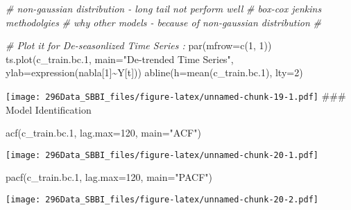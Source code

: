 \documentclass[
]{article}
\newenvironment{Shaded}{\begin{snugshade}}{\end{snugshade}}
\newcommand{\AttributeTok}[1]{\textcolor[rgb]{0.77,0.63,0.00}{#1}}
\newcommand{\CommentTok}[1]{\textcolor[rgb]{0.56,0.35,0.01}{\textit{#1}}}
\newcommand{\DecValTok}[1]{\textcolor[rgb]{0.00,0.00,0.81}{#1}}
\newcommand{\FloatTok}[1]{\textcolor[rgb]{0.00,0.00,0.81}{#1}}
\newcommand{\FunctionTok}[1]{\textcolor[rgb]{0.00,0.00,0.00}{#1}}
\newcommand{\NormalTok}[1]{#1}
\newcommand{\SpecialCharTok}[1]{\textcolor[rgb]{0.00,0.00,0.00}{#1}}
\newcommand{\StringTok}[1]{\textcolor[rgb]{0.31,0.60,0.02}{#1}}
\begin{document}
\begin{Shaded}
\begin{Highlighting}[]
\CommentTok{\# non{-}gaussian distribution {-} long tail not perform well}
\CommentTok{\# box{-}cox jenkins methodolgies }
\CommentTok{\# why other models {-} because of non{-}gaussian distribution}
\CommentTok{\# }
\end{Highlighting}
\end{Shaded}

\begin{Shaded}
\begin{Highlighting}[]
\CommentTok{\# Plot it for De{-}seasonlized Time Series :}
\FunctionTok{par}\NormalTok{(}\AttributeTok{mfrow=}\FunctionTok{c}\NormalTok{(}\DecValTok{1}\NormalTok{, }\DecValTok{1}\NormalTok{))}
\FunctionTok{ts.plot}\NormalTok{(c\_train.bc}\FloatTok{.1}\NormalTok{, }\AttributeTok{main=}\StringTok{"De{-}trended Time Series"}\NormalTok{,}
\AttributeTok{ylab=}\FunctionTok{expression}\NormalTok{(nabla[}\DecValTok{1}\NormalTok{]}\SpecialCharTok{\textasciitilde{}}\NormalTok{Y[t]))}
\FunctionTok{abline}\NormalTok{(}\AttributeTok{h=}\FunctionTok{mean}\NormalTok{(c\_train.bc}\FloatTok{.1}\NormalTok{), }\AttributeTok{lty=}\DecValTok{2}\NormalTok{)}
\end{Highlighting}
\end{Shaded}

\texttt{[image: 296Data\_SBBI\_files/figure-latex/unnamed-chunk-19-1.pdf]}
\#\#\# Model Identification

\begin{Shaded}
\begin{Highlighting}[]
\FunctionTok{acf}\NormalTok{(c\_train.bc}\FloatTok{.1}\NormalTok{, }\AttributeTok{lag.max=}\DecValTok{120}\NormalTok{, }\AttributeTok{main=}\StringTok{"ACF"}\NormalTok{)}
\end{Highlighting}
\end{Shaded}

\texttt{[image: 296Data\_SBBI\_files/figure-latex/unnamed-chunk-20-1.pdf]}

\begin{Shaded}
\begin{Highlighting}[]
\FunctionTok{pacf}\NormalTok{(c\_train.bc}\FloatTok{.1}\NormalTok{, }\AttributeTok{lag.max=}\DecValTok{120}\NormalTok{, }\AttributeTok{main=}\StringTok{"PACF"}\NormalTok{)}
\end{Highlighting}
\end{Shaded}

\texttt{[image: 296Data\_SBBI\_files/figure-latex/unnamed-chunk-20-2.pdf]}
\end{document}

